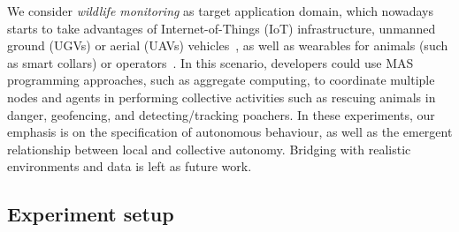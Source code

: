 We consider \emph{wildlife monitoring} as target application domain, which nowadays
 starts to take advantages of Internet-of-Things (IoT) infrastructure, 
 unmanned ground (UGVs) or aerial (UAVs) vehicles~\cite{DBLP:journals/sensors/GonzalezMPJMG16}, as well as 
 wearables for animals (such as smart collars) or operators~\cite{DBLP:conf/ntms/AyeleMH18a}. 
%
In this scenario, developers could 
 use MAS programming approaches,
 such as aggregate computing,
 to coordinate multiple nodes and agents
 in performing collective activities 
 such as rescuing animals in danger, 
 geofencing, 
 and 
 detecting/tracking poachers. 
%
In these experiments, our emphasis is
 on the specification of autonomous behaviour,
 as well as the emergent relationship between 
 local and collective autonomy.
%
Bridging with realistic environments and data is left as future work.

\subsection{Experiment setup} \label{mdpi2020:sb:experiment-setup}

